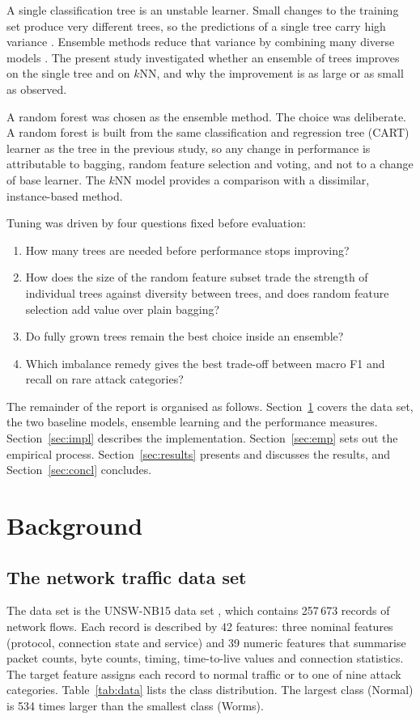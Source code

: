 \documentclass[conference,10pt]{IEEEtran}
\begin{document}
A single classification tree is an unstable learner. Small changes to the training set produce very different trees, so the predictions of a single tree carry high variance \cite{breiman1996bagging}. Ensemble methods reduce that variance by combining many diverse models \cite{dietterich2000ensemble}. The present study investigated whether an ensemble of trees improves on the single tree and on $k$NN, and why the improvement is as large or as small as observed.

A random forest \cite{breiman2001random} was chosen as the ensemble method. The choice was deliberate. A random forest is built from the same classification and regression tree (CART) learner \cite{breiman1984cart} as the tree in the previous study, so any change in performance is attributable to bagging, random feature selection and voting, and not to a change of base learner. The $k$NN model provides a comparison with a dissimilar, instance-based method.

Tuning was driven by four questions fixed before evaluation:
\begin{enumerate}
\item How many trees are needed before performance stops improving?
\item How does the size of the random feature subset trade the strength of individual trees against diversity between trees, and does random feature selection add value over plain bagging?
\item Do fully grown trees remain the best choice inside an ensemble?
\item Which imbalance remedy gives the best trade-off between macro F1 and recall on rare attack categories?
\end{enumerate}

The remainder of the report is organised as follows. Section~\ref{sec:background} covers the data set, the two baseline models, ensemble learning and the performance measures. Section~\ref{sec:impl} describes the implementation. Section~\ref{sec:emp} sets out the empirical process. Section~\ref{sec:results} presents and discusses the results, and Section~\ref{sec:concl} concludes.

\section{Background}\label{sec:background}

\subsection{The network traffic data set}
The data set is the UNSW-NB15 data set \cite{moustafa2015unsw}, which contains 257\,673 records of network flows. Each record is described by 42 features: three nominal features (protocol, connection state and service) and 39 numeric features that summarise packet counts, byte counts, timing, time-to-live values and connection statistics. The target feature assigns each record to normal traffic or to one of nine attack categories. Table~\ref{tab:data} lists the class distribution. The largest class (Normal) is 534 times larger than the smallest class (Worms).
\end{document}
